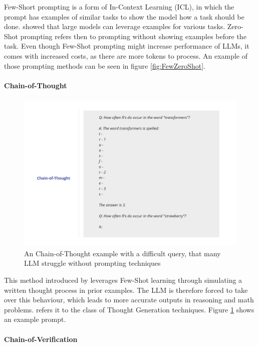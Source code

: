 Few-Short prompting is a form of In-Context Learning (ICL), in which the prompt has examples of similar tasks to show the model how a task should be done. \citet{Brown.28.05.2020} showed that large models can leverage examples for various tasks. Zero-Shot prompting refers then to prompting without showing examples before the task. Even though Few-Shot prompting might increase performance of LLMs, it comes with increased costs, as there are more tokens to process. An example of those prompting methods can be seen in figure \ref{fig:FewZeroShot}.

\paragraph{Chain-of-Thought}

\begin{figure}[h!]
    \centering
    \includegraphics[width=\textwidth]{images/Chain-of-Thought.jpg}
    \caption{An Chain-of-Thought example with a difficult query, that many LLM struggle without prompting techniques}
    \label{fig:CoT}
\end{figure}


This method introduced by \citet{Wei.28.01.2022} leverages Few-Shot learning through simulating a written thought process in prior examples. The LLM is therefore forced to take over this behaviour, which leads to more accurate outputs in reasoning and math problems. \citet{Schulhoff.06.06.2024} refers it to the class of Thought Generation techniques. Figure \ref{fig:CoT} shows an example prompt.

\paragraph{Chain-of-Verification}
